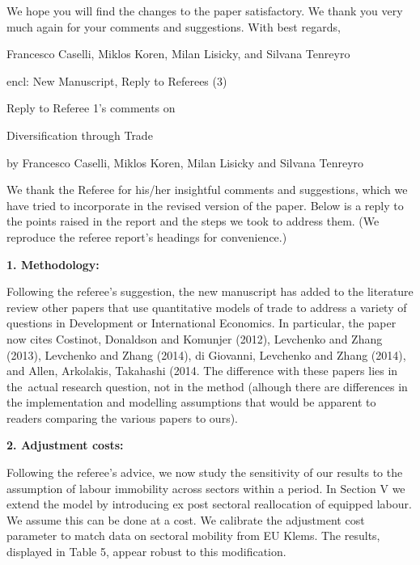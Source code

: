 \documentclass[12pt]{article}
\begin{document}
We hope you will find the changes to the paper satisfactory. We thank you
very much again for your comments and suggestions. With best regards,\bigskip

Francesco Caselli, Miklos Koren, Milan Lisicky, and Silvana Tenreyro

encl: New Manuscript, Reply to Referees (3)

\begin{center}
\pagebreak

\thispagestyle{plain}\setcounter{page}{1}Reply to Referee 1's comments on

{\Large Diversification through Trade}

by Francesco Caselli, Miklos Koren, Milan Lisicky and Silvana
Tenreyro\medskip

\bigskip \bigskip
\end{center}

We thank the Referee for his/her insightful comments and suggestions, which
we have tried to incorporate in the revised version of the paper. Below is a
reply to the points raised in the report and the steps we took to address
them. (We reproduce the referee report's headings for convenience.)\bigskip

\textbf{1. Methodology: }

Following the referee's suggestion, the new manuscript has added to the
literature review other papers that use quantitative models of trade to
address a variety of questions in Development or International Economics. In
particular, the paper now cites Costinot, Donaldson and Komunjer (2012),
Levchenko and Zhang (2013), Levchenko and Zhang (2014), di Giovanni,
Levchenko and Zhang (2014), and Allen,  Arkolakis, Takahashi (2014. The
difference with these papers lies in the\ actual research question, not in
the method (alhough there are differences in the implementation and
modelling assumptions that would be apparent to readers comparing the
various papers to ours).\bigskip 

\textbf{2. Adjustment costs:}

Following the referee's advice, we now study the sensitivity of our results
to the assumption of labour immobility across sectors within a period. In
Section V we extend the model by introducing ex post sectoral reallocation
of equipped labour. We assume this can be done at a cost. We calibrate the
adjustment cost parameter to match data on sectoral mobility from EU Klems.
The results, displayed in Table 5, appear robust to this modification.
\end{document}
